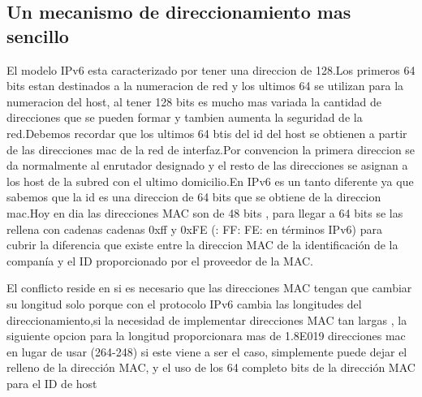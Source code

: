 \documentclass[11pt,a4paper]{article}
\begin{document}
\subsection{Un mecanismo de direccionamiento  mas sencillo}
El modelo IPv6 esta  caracterizado por tener  una direccion de 128.Los primeros 64 bits estan destinados a la numeracion de red y los ultimos 64 se utilizan para la numeracion del host, al tener 128 bits es mucho mas variada la cantidad de direcciones que se pueden formar  y tambien aumenta la seguridad de la red.Debemos recordar que los ultimos 64 btis del id del host se obtienen a partir de las direcciones mac de la red de interfaz.Por convencion la primera direccion se da normalmente al enrutador designado y el resto de las direcciones se asignan a los host de la subred con el ultimo domicilio.En IPv6 es un tanto diferente ya que  sabemos que la id es una direccion  de 64 bits que se obtiene de la direccion mac.Hoy en dia las direcciones MAC son de 48 bits , para llegar a 64 bits se las rellena con cadenas cadenas 0xff y 0xFE (: FF: FE: en términos IPv6) para cubrir la diferencia que existe entre la direccion MAC de la identificación de la companía y el ID proporcionado por el proveedor de la MAC.\par
El conflicto reside en si es necesario que las direcciones MAC tengan que cambiar su longitud  solo porque con el protocolo IPv6 cambia las longitudes del direccionamiento,si la necesidad de implementar direcciones MAC tan largas , la siguiente opcion para la longitud proporcionara mas de 1.8E019 direcciones mac en lugar de usar (264-248) si este viene a ser el
caso, simplemente puede dejar el relleno de la dirección MAC, y el uso de los 64 completo
bits de la dirección MAC para el ID de host
\end{document}
